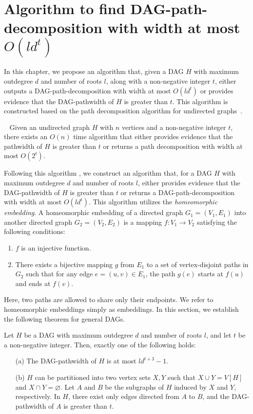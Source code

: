 \documentclass[runningheads]{llncs}
\theoremstyle{plain}
\theoremstyle{definition}
\begin{document}
\section{Algorithm to find DAG-path-decomposition with width at most $O(ld^t)$}

In this chapter, we propose an algorithm that, given a DAG $H$ with maximum outdegree $d$ and number of roots $l$, along with a non-negative integer $t$, either outputs a DAG-path-decomposition with width at most $O(ld^t)$ or provides evidence that the DAG-pathwidth of $H$ is greater than $t$. This algorithm is constructed based on the path decomposition algorithm for undirected graphs~\cite{art8}.

\begin{proposition}{~\cite{art8}}\label{pathwidth algorithm of undirected graph}
    Given an undirected graph $H$ with $n$ vertices and a non-negative integer $t$, there exists an $O(n)$ time algorithm that either provides evidence that the pathwidth of $H$ is greater than $t$ or returns a path decomposition with width at most $O(2^t)$.
\end{proposition}

Following this algorithm \cite{art8}, we construct an algorithm that, for a DAG $H$ with maximum outdegree $d$ and number of roots $l$, either provides evidence that the DAG-pathwidth of $H$ is greater than $t$ or returns a DAG-path-decomposition with width at most $O(ld^t)$. This algorithm utilizes the \emph{homeomorphic embedding}. A homeomorphic embedding of a directed graph $G_1 = (V_1, E_1)$ into another directed graph $G_2 = (V_2, E_2)$ is a mapping $f: V_1 \rightarrow V_2$ satisfying the following conditions:
\begin{enumerate}
    \item $f$ is an injective function.
    \item There exists a bijective mapping $g$ from $E_1$ to a set of vertex-disjoint paths in $G_2$ such that for any edge $e = (u, v) \in E_1$, the path $g(e)$ starts at $f(u)$ and ends at $f(v)$.
\end{enumerate}
Here, two paths are allowed to share only their endpoints. We refer to homeomorphic embeddings simply as embeddings. In this section, we establish the following theorem for general DAGs.

\begin{theorem}\label{approximation3}
    Let $H$ be a DAG with maximum outdegree $d$ and number of roots $l$, and let $t$ be a non-negative integer. Then, exactly one of the following holds:
    \begin{enumerate}
        \item[(a)] The DAG-pathwidth of $H$ is at most $ld^{t+3}-1$.
        \item[(b)] $H$ can be partitioned into two vertex sets $X, Y$ such that $X \cup Y = V[H]$ and $X \cap Y = \varnothing$. Let $A$ and $B$ be the subgraphs of $H$ induced by $X$ and $Y$, respectively. In $H$, there exist only edges directed from $A$ to $B$, and the DAG-pathwidth of $A$ is greater than $t$.
    
    \end{enumerate}
\end{theorem}
\end{document}
